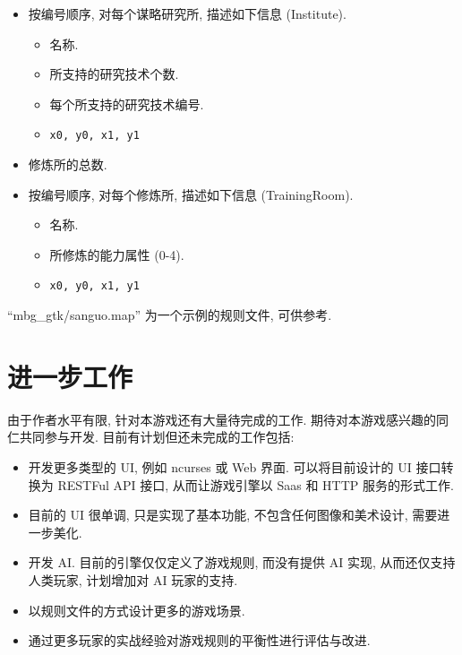 \documentclass[UTF8, zihao=-4]{ctexart} %
\newcommand{\lcode}{\lstinline} % 段内插入代码
\begin{document}
\begin{itemize}
    \item 按编号顺序, 对每个谋略研究所, 描述如下信息 (Institute).
        \begin{itemize}
            \item 名称.
            \item 所支持的研究技术个数.
            \item 每个所支持的研究技术编号.
            \item \lcode{x0, y0, x1, y1} 
        \end{itemize}
    \item 修炼所的总数.
    \item 按编号顺序, 对每个修炼所, 描述如下信息 (TrainingRoom).
        \begin{itemize}
            \item 名称.
            \item 所修炼的能力属性 (0-4).
            \item \lcode{x0, y0, x1, y1} 
        \end{itemize}
\end{itemize}
``mbg\_gtk/sanguo.map'' 为一个示例的规则文件, 可供参考.

\section{进一步工作}
由于作者水平有限, 针对本游戏还有大量待完成的工作. 
期待对本游戏感兴趣的同仁共同参与开发. 目前有计划但还未完成的工作包括:
\begin{itemize}
    \item 开发更多类型的 UI, 例如 ncurses 或 Web 界面. 可以将目前设计的 UI 接口转换为
        RESTFul API 接口, 从而让游戏引擎以 Saas 和 HTTP 服务的形式工作.
    \item 目前的 UI 很单调, 只是实现了基本功能, 不包含任何图像和美术设计, 需要进一步美化.
    \item 开发 AI. 目前的引擎仅仅定义了游戏规则, 而没有提供 AI 实现, 
        从而还仅支持人类玩家, 计划增加对 AI 玩家的支持.
    \item 以规则文件的方式设计更多的游戏场景. 
    \item 通过更多玩家的实战经验对游戏规则的平衡性进行评估与改进.
\end{itemize}
\end{document}
